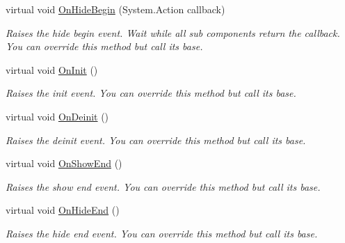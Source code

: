 \begin{DoxyCompactItemize}
virtual void \hyperlink{class_unity_engine_1_1_u_i_1_1_windows_1_1_window_component_base_a93b0765e7b12d7142972d8156fb102c9}{On\+Hide\+Begin} (System.\+Action callback)
\begin{DoxyCompactList}\small\item\em Raises the hide begin event. Wait while all sub components return the callback. You can override this method but call it\textquotesingle{}s base. \end{DoxyCompactList}\item 
virtual void \hyperlink{class_unity_engine_1_1_u_i_1_1_windows_1_1_window_component_base_a1bf684e75f1715bde930ed07d7ee6d5c}{On\+Init} ()
\begin{DoxyCompactList}\small\item\em Raises the init event. You can override this method but call it\textquotesingle{}s base. \end{DoxyCompactList}\item 
virtual void \hyperlink{class_unity_engine_1_1_u_i_1_1_windows_1_1_window_component_base_a191d5e3d4b11f768a8b9608ecce35b3b}{On\+Deinit} ()
\begin{DoxyCompactList}\small\item\em Raises the deinit event. You can override this method but call it\textquotesingle{}s base. \end{DoxyCompactList}\item 
virtual void \hyperlink{class_unity_engine_1_1_u_i_1_1_windows_1_1_window_component_base_a9d378437182e59de3af2baeddace996c}{On\+Show\+End} ()
\begin{DoxyCompactList}\small\item\em Raises the show end event. You can override this method but call it\textquotesingle{}s base. \end{DoxyCompactList}\item 
virtual void \hyperlink{class_unity_engine_1_1_u_i_1_1_windows_1_1_window_component_base_af89642b3187cba97f0db61de15f7e914}{On\+Hide\+End} ()
\begin{DoxyCompactList}\small\item\em Raises the hide end event. You can override this method but call it\textquotesingle{}s base. \end{DoxyCompactList}\end{DoxyCompactItemize}
